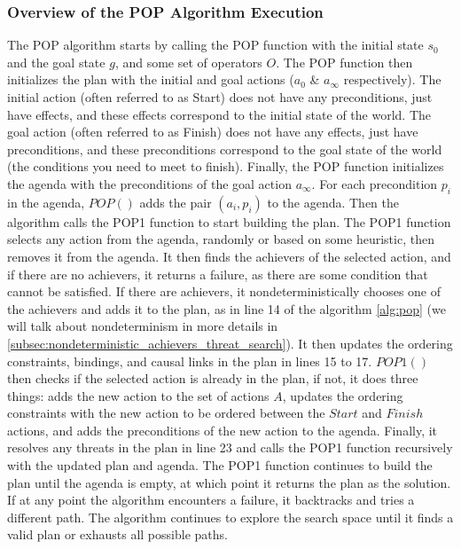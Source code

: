 \subsubsection{Overview of the POP Algorithm Execution} \label{subsubsec:pop_execution}
The \ac{POP} algorithm starts by calling the POP function with the initial state $s_0$ and the goal state $g$, and some set of operators $O$. The POP function then initializes the plan with the initial and goal actions ($a_0$ \& $a_{\infty}$ respectively). The initial action (often referred to as Start) does not have any preconditions, just have effects, and these effects correspond to the initial state of the world. The goal action (often referred to as Finish) does not have any effects, just have preconditions, and these preconditions correspond to the goal state of the world (the conditions you need to meet to finish). Finally, the POP function initializes the agenda with the preconditions of the goal action $a_{\infty}$. For each precondition $p_i$ in the agenda, \textbf{$POP()$} adds the pair $(a_i, p_i)$ to the agenda.
Then the algorithm calls the POP1 function to start building the plan. The POP1 function selects any action from the agenda, randomly or based on some heuristic, then removes it from the agenda. It then finds the achievers of the selected action, and if there are no achievers, it returns a failure, as there are some condition that cannot be satisfied. If there are achievers, it nondeterministically chooses one of the achievers and adds it to the plan, as in line 14 of the algorithm \ref{alg:pop} (we will talk about nondeterminism in more details in \autoref{subsec:nondeterministic_achievers_threat_search}). It then updates the ordering constraints, bindings, and causal links in the plan in lines 15 to 17.
\textbf{$POP1()$} then checks if the selected action is already in the plan, if not, it does three things: adds the new action to the set of actions $A$, updates the ordering constraints with the new action to be ordered between the $Start$ and $Finish$ actions, and adds the preconditions of the new action to the agenda.
Finally, it resolves any threats in the plan in line 23 and calls the POP1 function recursively with the updated plan and agenda. The POP1 function continues to build the plan until the agenda is empty, at which point it returns the plan as the solution. If at any point the algorithm encounters a failure, it backtracks and tries a different path. The algorithm continues to explore the search space until it finds a valid plan or exhausts all possible paths.


